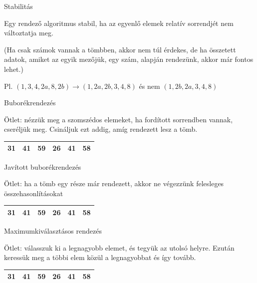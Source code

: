 \documentclass[hungarian]{beamer}
\begin{document}
\begin{frame}{Stabilitás}

Egy rendező algoritmus stabil, ha az egyenlő elemek relatív sorrendjét nem változtatja meg.

(Ha csak számok vannak a tömbben, akkor nem túl érdekes, de ha összetett adatok, amiket az egyik mezőjük, egy szám, alapján rendezünk, akkor már fontos lehet.)

Pl. $(1,3,4,2a,8,2b) \rightarrow  (1,2a,2b,3,4,8)$ és nem $(1,2b,2a,3,4,8)$

\end{frame}

\begin{frame}[t]{Buborékrendezés}

Ötlet: nézzük meg a szomszédos elemeket, ha fordított sorrendben vannak, cseréljük meg. Csináljuk ezt addig, amíg rendezett lesz a tömb.

\begin{tabular}{|c|c|c|c|c|c|}
    \hline
    31 & 41 & 59 & 26 & 41 & 58 \\
    \hline
\end{tabular}

\end{frame}

\begin{frame}[t]{Javított buborékrendezés}

Ötlet: ha a tömb egy része már rendezett, akkor ne végezzünk felesleges összehasonlításokat

\begin{tabular}{|c|c|c|c|c|c|}
    \hline
    31 & 41 & 59 & 26 & 41 & 58 \\
    \hline
\end{tabular}

\end{frame}

\begin{frame}[t]{Maximumkiválasztásos rendezés}

Ötlet: válasszuk ki a legnagyobb elemet, és tegyük az utolsó helyre. Ezután keressük meg a többi elem közül a legnagyobbat és így tovább.

\begin{tabular}{|c|c|c|c|c|c|}
    \hline
    31 & 41 & 59 & 26 & 41 & 58 \\
    \hline
\end{tabular}

\end{frame}
\end{document}
